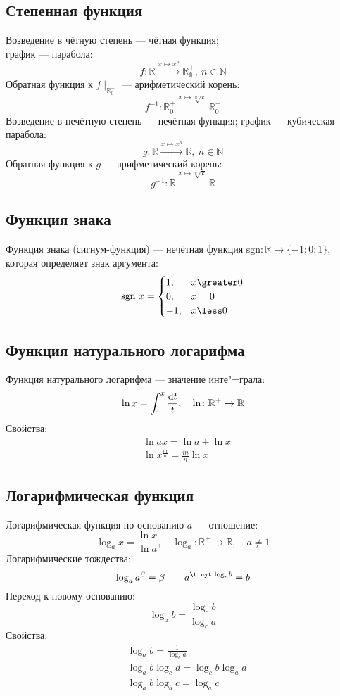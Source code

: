\subsection{Степенная функция}

{\bold Возведение в чётную степень} --- чётная функция;\\
график --- {\ital парабола}:\\[-10pt]
$$f\colon\mathbb{R}\xrightarrow{x\mapsto x^n}\mathbb{R^+_0},\ n\in\mathbb{N}$$
Обратная функция к $f\mid_{\mathbb{R}^+_0}$ --- {\bold арифметический корень}:\\[-3pt]
$$f^{-1}\colon\mathbb{R}^+_0\xrightarrow{x\mapsto\sqrt[n]{x}}\mathbb{R}^+_0$$
{\bold Возведение в нечётную степень} --- нечётная функция; график --- {\ital кубическая 
парабола}:
$$g\colon\mathbb{R}\xrightarrow{x\mapsto x^n}\mathbb{R},\ n\in\mathbb{N}$$
Обратная функция к $g$ --- {\bold арифметический корень}:
$$g^{-1}\colon\mathbb{R}\xrightarrow{x\mapsto\sqrt[n]{x}}\mathbb{R}$$

\subsection{Функция знака}

{\bold Функция знака} {\ital (сигнум-функция)} --- нечётная функция $\text{sgn}\colon
\mathbb{R}\to\{-1;0;1\}$, которая определяет знак аргумента:
$$\sgnn x=\begin{cases}
1, &x\greater 0\\
0, &x=0\\
-1, &x\less 0
\end{cases}$$

\subsection{Функция натурального логарифма}

{\bold Функция натурального логарифма} --- значение инте"=грала:
$$\ln x=\int_1^x\frac{\text{d} t}{t},\quad\ln\colon\mathbb{R}^+\to\mathbb{R}$$
Свойства:
\begin{align*}
&\ln ax=\ln a+\ln x\\
&\ln x^{\frac{m}{n}}=\frac{m}{n}\ln x
\end{align*}

\subsection{Логарифмическая функция}

{\bold Логарифмическая функция} по основанию $a$ --- отношение:
$$\log_ax=\frac{\ln x}{\ln a},\quad\log_a\colon\mathbb{R}^+\to\mathbb{R},\quad a\neq 1$$
Логарифмические тождества:
$$\log_aa^\beta=\beta\qquad a^{\text{\tinyt log}_ab}=b$$
Переход к новому основанию:
$$\log_ab=\frac{\log_cb}{\log_ca}$$
Свойства:
$$\begin{aligned}
&\log_ab=\frac{1}{\log_ba}\\
&\log_ab\log_cd=\log_cb\log_ad\\
&\log_ab\log_bc=\log_ac
\end{aligned}$$
